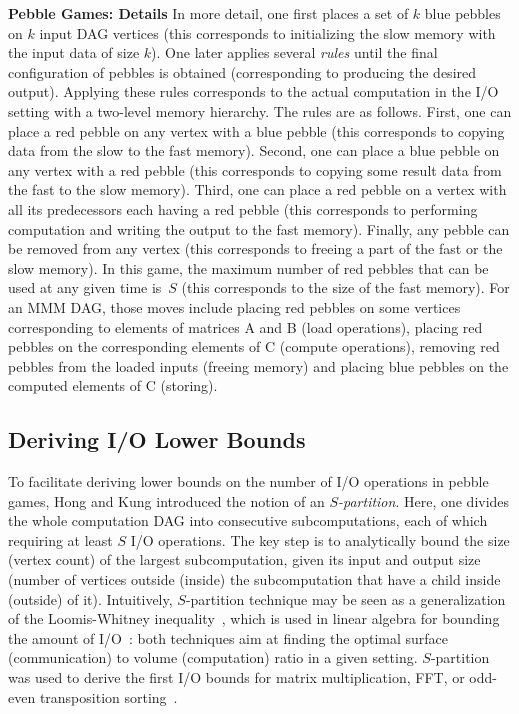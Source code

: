 \documentclass[sigplan,review,anonymous]{acmart}\settopmatter{printfolios=true,printccs=false,printacmref=false}
\newcommand{\macb}[1]{\textbf{\textsf{#1}}}
\begin{document}
\macb{Pebble Games: Details}
%
In more detail, one first places a set of $k$ blue pebbles on $k$ input DAG
vertices (this corresponds to initializing the slow memory with the input data
of size $k$). One later applies several \emph{rules} until the final
configuration of pebbles is obtained (corresponding to producing the desired
output). Applying these rules corresponds to the actual computation in the I/O
setting with a two-level memory hierarchy.  The rules are as follows. First,
one can place a red pebble on any vertex with a blue pebble (this corresponds
to copying data from the slow to the fast memory).  Second, one can place a
blue pebble on any vertex with a red pebble (this corresponds to copying some
result data from the fast to the slow memory). Third, one can place a red
pebble on a vertex with all its predecessors each having a red pebble (this
corresponds to performing computation and writing the output to the fast
memory). Finally, any pebble can be removed from any vertex (this corresponds
to freeing a part of the fast or the slow memory).
%
In this game, the maximum number of red pebbles that can be used at any given
time is~$S$ (this corresponds to the size of the fast memory). For an MMM DAG, 
those moves include placing red pebbles on some vertices corresponding to 
elements of
matrices A and B (load operations), placing red pebbles on the corresponding 
elements of C (compute operations), removing red pebbles from the loaded inputs 
(freeing memory) and placing blue pebbles on the computed elements of C 
(storing). 

\subsection{Deriving I/O Lower Bounds}

To facilitate deriving lower bounds on the number of I/O operations in pebble
games, Hong and Kung introduced the notion of an \emph{$S$-partition}. Here, one
divides the whole computation DAG into consecutive subcomputations, each of 
which requiring at least $S$ I/O operations.
The key step is to analytically bound the size (vertex count) of the largest
subcomputation, given its input and output size (number of vertices outside
(inside) the subcomputation that have a child inside (outside) of it). 
%
Intuitively, $S$-partition technique may be seen as a generalization of the
Loomis-Whitney inequality~\cite{loomisWhitney}, which is used in linear algebra 
for bounding
the amount of I/O~\cite{loomisApplied}: both techniques aim at finding the
optimal surface (communication) to volume (computation) ratio in a given
setting. 
%
$S$-partition was used to derive the first I/O bounds for matrix
multiplication, FFT, or odd-even transposition sorting~\cite{redblue}.
\end{document}
